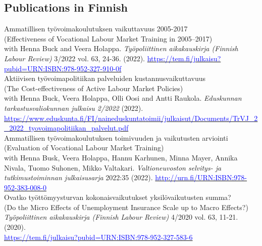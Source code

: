 \documentclass[16pt]{article}
\begin{document}
\subsection*{Publications in Finnish}

\noindent Ammatillisen työvoimakoulutuksen vaikuttavuus 2005-2017 \\
\noindent (Effectiveness of Vocational Labour Market Training in 2005–2017) \\
\noindent  with Henna Buck and Veera Holappa. \textit{Työpoliittinen aikakauskirja (Finnish Labour Review)} 3/2022 vol. 63, 24-36.  (2022). \href{https://tem.fi/julkaisu?pubid=URN:ISBN:978-952-327-910-0}{\textcolor{blue}{https://tem.fi/julkaisu?pubid=URN:ISBN:978-952-327-910-0f}} \\

\noindent Aktiivisen työvoimapolitiikan palveluiden kustannusvaikuttavuus \\
\noindent (The Cost-effectiveness of Active Labour Market Policies) \\
\noindent with Henna Buck, Veera Holappa, Olli Oosi and Antti Raukola. \textit{Eduskunnan tarkastusvaliokunnan julkaisu 2/2022} (2022). \href{https://www.eduskunta.fi/FI/naineduskuntatoimii/julkaisut/Documents/TrVJ\_2\_2022\_tyovoimapolitiikan\_palvelut.pdf}{\textcolor{blue}{https://www.eduskunta.fi/FI/naineduskuntatoimii/julkaisut/Documents/TrVJ\_2\_2022\_tyovoimapolitiikan\_palvelut.pdf}} \\

\noindent Ammatillisen ty\"{o}voimakoulutuksen toimivuuden ja vaikutusten arviointi \\
\noindent (Evaluation of Vocational Labour Market Training) \\
\noindent with Henna Busk, Veera Holappa, Hannu Karhunen, Minna Mayer, Annika Nivala, Tuomo Suhonen, Mikko Valtakari.  \textit{Valtioneuvoston selvitys- ja tutkimustoiminnan julkaisusarja} 2022:35 (2022). \href{http://urn.fi/URN:ISBN:978-952-383-008-0}{\textcolor{blue}{http://urn.fi/URN:ISBN:978-952-383-008-0}} \\

\noindent Ovatko ty\"{o}tt\"{o}myysturvan kokonaisvaikutukset yksil\"{o}vaikutusten summa? \\
\noindent (Do the Micro Effects of Unemployment Insurance Scale up to Macro Effects?) \\
\noindent  \textit{Ty\"{o}poliittinen aikakauskirja (Finnish Labour Review)} 4/2020 vol. 63, 11-21.  (2020). \\ \href{https://tem.fi/julkaisu?pubid=URN:ISBN:978-952-327-583-6} {\textcolor{blue}{https://tem.fi/julkaisu?pubid=URN:ISBN:978-952-327-583-6}}\\
\end{document}
